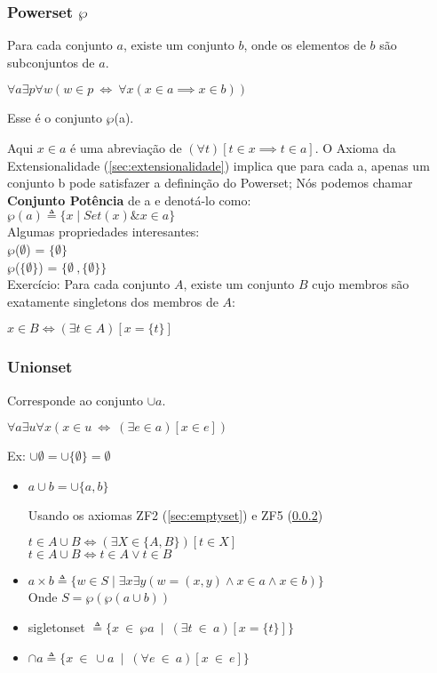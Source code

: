 \documentclass[12pt, a4paper]{article}
\begin{document}
\subsubsection{Powerset $\wp$}
Para cada conjunto $a$, existe um conjunto $b$, onde os elementos de $b$ são subconjuntos de $a$.
\begin{center}
$\forall a \exists p \forall w ( w \in p ~ \iff ~ \forall x (x \in a \implies x \in b))$
\end{center}

Esse é o conjunto $\wp$(a).

Aqui $x \in a$ é uma abreviação de $(\forall t)[t \in x \implies t \in a]$. O Axioma da Extensionalidade (\ref{sec:extensionalidade}) implica que para cada a, apenas um conjunto b pode satisfazer a defininção do Powerset; Nós podemos chamar \textbf{Conjunto Potência} de a e denotá-lo como:\\
$\wp(a) \triangleq \{x \mid Set(x) \& x \in a \}$\\

Algumas propriedades interesantes:\\
$\wp$($\emptyset$) = $\{ \emptyset \}$ \\
$\wp$($\{ \emptyset \} $) = $\{ \emptyset \ , \{ \emptyset \}\}$\\

Exercício: Para cada conjunto $A$, existe um conjunto $B$ cujo membros são exatamente singletons dos membros de $A$:
\begin{center}
$ x \in B \iff (\exists t \in A) [x = \{t\}]$
\end{center}
\subsubsection{Unionset}
\label{sec:unionset}
Corresponde ao conjunto $\cup a$.\\
\begin{center}
$\forall a \exists u \forall x ( x \in u ~\iff~ (\exists e \in a) [x \in e] )$
\end{center}

Ex: $\cup \emptyset = \cup \{ \emptyset \} = \emptyset$

\begin{itemize}
\item $a \cup b = \cup \{a,b\}$

Usando os axiomas ZF2 (\ref{sec:emptyset}) e ZF5 (\ref{sec:unionset})\\
\begin{center}
$t \in A \cup B \iff (\exists X \in \{A,B\})[t \in X]$\\
$t \in A \cup B \iff t \in A \vee t \in B$
\end{center}
\item $ a \times b \triangleq \{ w \in S \mid \exists x \exists y (w = (x,y) \land x \in a \land x \in b)\}$ \\
Onde $S = \wp(\wp(a \cup b))$
\item sigletonset $ \triangleq \{ x ~ \in ~ \wp a ~\mid~ (\exists t ~\in~ a)[x = \{t\}]\}$
\item $\cap a \triangleq \{x ~\in~ \cup a ~\mid~ (\forall e ~\in~ a)[x ~\in~ e]\}$
\end{itemize}
\end{document}
